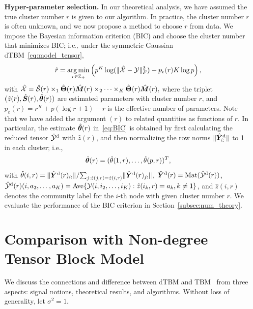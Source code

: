 \documentclass[journal]{IEEEtran}
\theoremstyle{definition}
\theoremstyle{definition}
\newcommand{\of}[1]{\left(#1\right)}
\begin{document}
{\bf Hyper-parameter selection.} In our theoretical analysis, we have assumed the true cluster number $r$ is given to our algorithm. In practice, the cluster number $r$ is often unknown, and we now propose a method to choose $r$ from data. We impose the Bayesian information criterion (BIC) and choose the cluster number that minimizes BIC; i.e., under the symmetric Gaussian dTBM~\eqref{eq:model_tensor},
\begin{align}\label{eq:BIC}
 \hat r = \argmin_{r \in \mathbb{Z}_+ } \of{p^K \log(\onormSize{}{\hat \tX - \tY}_F^2)  + p_e(r) K \log p},
\end{align}
with $\hat {\mathcal{X}} = \hat {\mathcal{S}}(r) \times_1 \hat {\boldsymbol{\Theta}}(r) \hat {\bm M}(r) \times_2 \cdots \times_K \hat {\boldsymbol{\Theta}}(r) \hat {\bm M}(r),$ where the triplet $(\hat z(r), \hat {\bm S}(r),\hat {\boldsymbol{\theta}}(r))$ are estimated parameters with cluster number $r$, and $p_e (r)= r^K + p(\log r + 1) - r$ is the effective number of parameters. Note that we have added the argument $(r)$ to related quantities as functions of $r$. In particular, the estimate $\hat {\boldsymbol{\theta}}(r)$ in~\eqref{eq:BIC} is obtained by first calculating the reduced tensor $\hat {\mathcal{Y}}^{\text{d}}$ with $\hat z(r)$, and then normalizing the row norms $\lVert\hat {\bm Y}_{i:}^{\text{d}}\rVert$ to 1 in each cluster; i.e., 
\begin{equation}
 \hat {\boldsymbol{\theta}}(r)=(\hat \theta(1,r),\ldots,\hat \theta(p,r))^T,
\end{equation}
with $\hat \theta(i,r) = {\lVert\hat {\bm Y}^{\text{d}}(r)_{i:}\rVert}/{\sum_{j: \hat z(j,r) =  \hat z(i,r)} \lVert\hat {\bm Y}^{\text{d}}(r)_{j:}\rVert}$, $\hat {\bm Y}^{\text{d}}(r) = \text{Mat}(\hat {\mathcal{Y}}^{\text{d}}(r))$, $\hat {\mathcal{Y}}^{\text{d}}(r)(i,a_2,\ldots,a_K) =  \text{Ave}\{\mathcal{Y}(i,i_2,\ldots,i_K): \hat z(i_k, r) = a_k, k \neq 1 \}$, and $\hat z(i,r)$ denotes the community label for the $i$-th node with given cluster number $r$. We evaluate the performance of the BIC criterion in Section~\ref{subsec:num_theory}.

\section{Comparison with Non-degree Tensor Block Model} \label{sec:tbm}

We discuss the connections and difference between dTBM and TBM~\citep{han2020exact} from three aspects: signal notions, theoretical results, and algorithms. Without loss of generality, let $\sigma^2=1$. 
\end{document}
